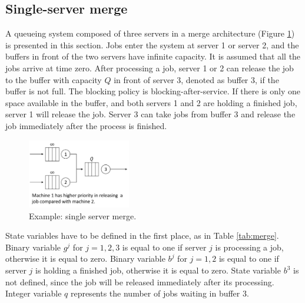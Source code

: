 \documentclass[]{interact}
\theoremstyle{plain}%
\theoremstyle{definition}
\theoremstyle{remark}
\begin{document}
\subsection{Single-server merge}

A queueing system composed of three servers in a merge architecture (Figure \ref{fig:merge}) is presented in this section. Jobs enter the system at server 1 or server 2, and the buffers in front of the two servers have infinite capacity. It is assumed that all the jobs arrive at time zero. After processing a job, server 1 or 2 can release the job to the buffer with capacity $Q$ in front of server 3, denoted as buffer 3, if the buffer is not full. The blocking policy is blocking-after-service. If there is only one space available in the buffer, and both servers 1 and 2 are holding a finished job, server 1 will release the job. Server 3 can take jobs from buffer 3 and release the job immediately after the process is finished. 

\begin{figure}[h]
	\centering
	\includegraphics[width=0.4\textwidth]{Figures/merge.png}
	\caption{Example: single server merge.}
	\label{fig:merge}
\end{figure}

State variables have to be defined in the first place, as in Table \ref{tab:merge}. Binary variable $g^{j}$ for $j=1,2,3$ is equal to one if server $j$ is processing a job, otherwise it is equal to zero. Binary variable $b^{j}$ for $j=1,2$ is equal to one if server $j$ is holding a finished job, otherwise it is equal to zero. State variable $b^3$ is not defined, since the job will be released immediately after its processing. Integer variable $q$ represents the number of jobs waiting in buffer 3. 
\end{document}
